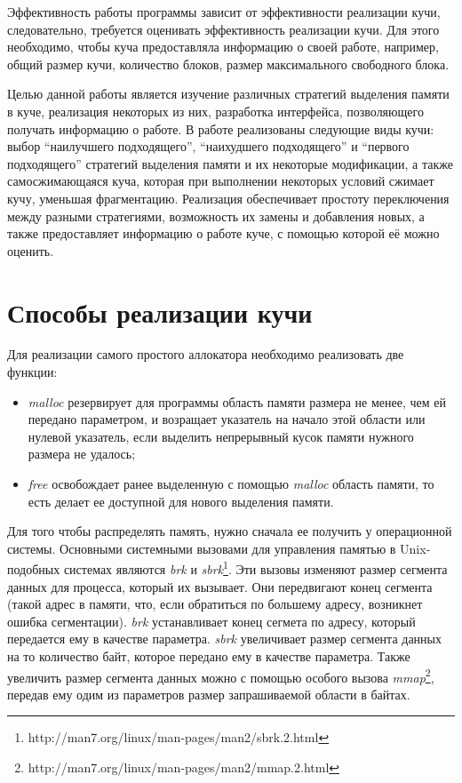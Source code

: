 \documentclass[12pt,a4paper]{article}
\begin{document}
Эффективность работы программы зависит от эффективности реализации кучи, следовательно, требуется оценивать эффективность реализации кучи. Для этого необходимо, чтобы куча предоставляла информацию о своей работе, например, общий размер кучи, количество блоков, размер максимального свободного блока.

Целью данной работы является изучение различных стратегий выделения памяти в куче, реализация некоторых из них, разработка интерфейса, позволяющего получать информацию о работе. В работе реализованы следующие виды кучи: выбор ``наилучшего подходящего'', ``наихудшего подходящего'' и ``первого подходящего'' стратегий выделения памяти и их некоторые модификации, а также самосжимающаяся куча, которая при выполнении некоторых условий сжимает кучу, уменьшая фрагментацию. Реализация обеспечивает простоту переключения между разными стратегиями, возможность  их замены и добавления новых, а также предоставляет информацию о работе куче, с помощью которой её можно оценить.

\newpage
\section{Способы реализации кучи}
Для реализации самого простого аллокатора необходимо реализовать две функции:
\begin{itemize}
\item
\textit{malloc} резервирует для программы область памяти размера не менее, чем
ей передано параметром, и возращает указатель на начало этой области или нулевой указатель,
если выделить непрерывный кусок памяти нужного размера не удалось;
\item
\textit{free} освобождает ранее выделенную с помощью \textit{malloc} область памяти, то есть делает ее доступной для нового выделения памяти.
\end{itemize}
Для того чтобы распределять память, нужно сначала ее получить у операционной системы.  
Основными системными вызовами для управления памятью в
Unix-подобных системах являются \textit{brk} и \textit{sbrk}\footnote{http://man7.org/linux/man-pages/man2/sbrk.2.html}.
Эти вызовы изменяют размер сегмента данных для процесса, который их вызывает. Они
передвигают конец сегмента (такой адрес в памяти, что, если обратиться по большему
адресу, возникнет ошибка сегментации). \textit{brk} устанавливает конец сегмета по адресу,
который передается ему в качестве параметра. \textit{sbrk} увеличивает размер
сегмента данных на то количество байт, которое передано ему в качестве параметра. 
Также увеличить размер сегмента данных можно с помощью особого вызова 
\textit{mmap}\footnote{http://man7.org/linux/man-pages/man2/mmap.2.html},
передав ему одим из параметров размер запрашиваемой области в байтах.
\end{document}
